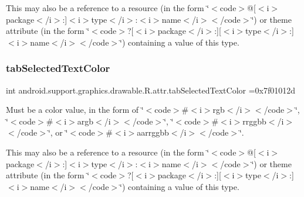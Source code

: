 This may also be a reference to a resource (in the form \char`\"{}$<$code$>$@\mbox{[}$<$i$>$package$<$/i$>$\+:\mbox{]}$<$i$>$type$<$/i$>$\+:$<$i$>$name$<$/i$>$$<$/code$>$\char`\"{}) or theme attribute (in the form \char`\"{}$<$code$>$?\mbox{[}$<$i$>$package$<$/i$>$\+:\mbox{]}\mbox{[}$<$i$>$type$<$/i$>$\+:\mbox{]}$<$i$>$name$<$/i$>$$<$/code$>$\char`\"{}) containing a value of this type. \mbox{\label{classandroid_1_1support_1_1graphics_1_1drawable_1_1R_1_1attr_a56f2ab8b6e9676424ea637e219f12c28}} 
\subsubsection{\texorpdfstring{tab\+Selected\+Text\+Color}{tabSelectedTextColor}}
{\footnotesize\ttfamily int android.\+support.\+graphics.\+drawable.\+R.\+attr.\+tab\+Selected\+Text\+Color =0x7f01012d\hspace{0.3cm}{\ttfamily [static]}}

Must be a color value, in the form of \char`\"{}$<$code$>$\#$<$i$>$rgb$<$/i$>$$<$/code$>$\char`\"{}, \char`\"{}$<$code$>$\#$<$i$>$argb$<$/i$>$$<$/code$>$\char`\"{}, \char`\"{}$<$code$>$\#$<$i$>$rrggbb$<$/i$>$$<$/code$>$\char`\"{}, or \char`\"{}$<$code$>$\#$<$i$>$aarrggbb$<$/i$>$$<$/code$>$\char`\"{}. 

This may also be a reference to a resource (in the form \char`\"{}$<$code$>$@\mbox{[}$<$i$>$package$<$/i$>$\+:\mbox{]}$<$i$>$type$<$/i$>$\+:$<$i$>$name$<$/i$>$$<$/code$>$\char`\"{}) or theme attribute (in the form \char`\"{}$<$code$>$?\mbox{[}$<$i$>$package$<$/i$>$\+:\mbox{]}\mbox{[}$<$i$>$type$<$/i$>$\+:\mbox{]}$<$i$>$name$<$/i$>$$<$/code$>$\char`\"{}) containing a value of this type. \mbox{\label{classandroid_1_1support_1_1graphics_1_1drawable_1_1R_1_1attr_a610cd5735c6131a48aa0efce0bf69305}} 
